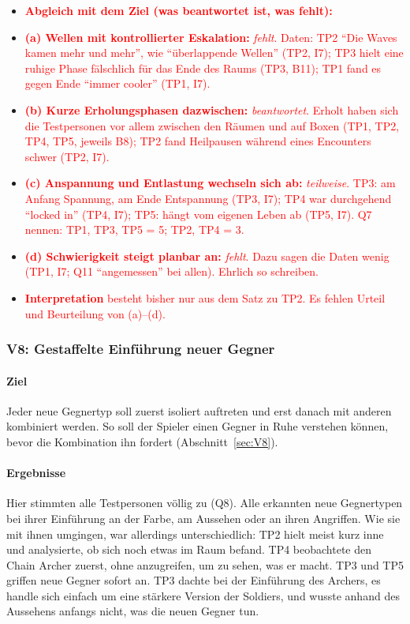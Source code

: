 \documentclass[../Main.tex]{subfiles}
\begin{document}
\begin{itemize}[leftmargin=1.5cm]
    \item \textcolor{red}{\textbf{Abgleich mit dem Ziel (was beantwortet ist, was fehlt):}}
    \item \textcolor{red}{\textbf{(a) Wellen mit kontrollierter Eskalation:} \emph{fehlt}. Daten: TP2 \enquote{Die Waves kamen mehr und mehr}, wie \enquote{überlappende Wellen} (TP2, I7); TP3 hielt eine ruhige Phase fälschlich für das Ende des Raums (TP3, B11); TP1 fand es gegen Ende \enquote{immer cooler} (TP1, I7).}
    \item \textcolor{red}{\textbf{(b) Kurze Erholungsphasen dazwischen:} \emph{beantwortet}. Erholt haben sich die Testpersonen vor allem zwischen den Räumen und auf Boxen (TP1, TP2, TP4, TP5, jeweils B8); TP2 fand Heilpausen während eines Encounters schwer (TP2, I7).}
    \item \textcolor{red}{\textbf{(c) Anspannung und Entlastung wechseln sich ab:} \emph{teilweise}. TP3: am Anfang Spannung, am Ende Entspannung (TP3, I7); TP4 war durchgehend \enquote{locked in} (TP4, I7); TP5: hängt vom eigenen Leben ab (TP5, I7). Q7 nennen: TP1, TP3, TP5 = 5; TP2, TP4 = 3.}
    \item \textcolor{red}{\textbf{(d) Schwierigkeit steigt planbar an:} \emph{fehlt}. Dazu sagen die Daten wenig (TP1, I7; Q11 \enquote{angemessen} bei allen). Ehrlich so schreiben.}
    \item \textcolor{red}{\textbf{Interpretation} besteht bisher nur aus dem Satz zu TP2. Es fehlen Urteil und Beurteilung von (a)--(d).}
\end{itemize}

\subsubsection{V8: Gestaffelte Einführung neuer Gegner}

\paragraph{Ziel}
Jeder neue Gegnertyp soll zuerst isoliert auftreten und erst danach mit anderen kombiniert werden. So soll der Spieler einen Gegner in Ruhe verstehen können, bevor die Kombination ihn fordert (Abschnitt~\ref{sec:V8}).

\paragraph{Ergebnisse}
Hier stimmten alle Testpersonen völlig zu (Q8). Alle erkannten neue Gegnertypen bei ihrer Einführung an der Farbe, am Aussehen oder an ihren Angriffen. Wie sie mit ihnen umgingen, war allerdings unterschiedlich: TP2 hielt meist kurz inne und analysierte, ob sich noch etwas im Raum befand. TP4 beobachtete den Chain Archer zuerst, ohne anzugreifen, um zu sehen, was er macht. TP3 und TP5 griffen neue Gegner sofort an. TP3 dachte bei der Einführung des Archers, es handle sich einfach um eine stärkere Version der Soldiers, und wusste anhand des Aussehens anfangs nicht, was die neuen Gegner tun.
\end{document}
